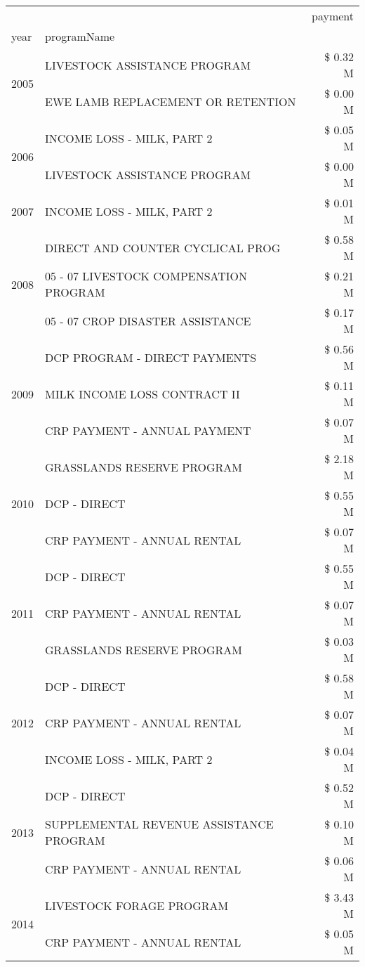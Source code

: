 \begin{tabular}{llr}
\toprule
 &  & payment \\
year & programName &  \\
\midrule
\multirow[t]{2}{*}{2005} & LIVESTOCK ASSISTANCE PROGRAM & \$ 0.32 M \\
 & EWE LAMB REPLACEMENT OR RETENTION & \$ 0.00 M \\
\cline{1-3}
\multirow[t]{2}{*}{2006} & INCOME LOSS - MILK, PART 2 & \$ 0.05 M \\
 & LIVESTOCK ASSISTANCE PROGRAM & \$ 0.00 M \\
\cline{1-3}
2007 & INCOME LOSS - MILK, PART 2 & \$ 0.01 M \\
\cline{1-3}
\multirow[t]{3}{*}{2008} & DIRECT AND COUNTER CYCLICAL PROG & \$ 0.58 M \\
 & 05 - 07 LIVESTOCK COMPENSATION PROGRAM & \$ 0.21 M \\
 & 05 - 07 CROP DISASTER ASSISTANCE & \$ 0.17 M \\
\cline{1-3}
\multirow[t]{3}{*}{2009} & DCP PROGRAM - DIRECT PAYMENTS & \$ 0.56 M \\
 & MILK INCOME LOSS CONTRACT II & \$ 0.11 M \\
 & CRP PAYMENT - ANNUAL PAYMENT & \$ 0.07 M \\
\cline{1-3}
\multirow[t]{3}{*}{2010} & GRASSLANDS RESERVE PROGRAM & \$ 2.18 M \\
 & DCP - DIRECT & \$ 0.55 M \\
 & CRP PAYMENT - ANNUAL RENTAL & \$ 0.07 M \\
\cline{1-3}
\multirow[t]{3}{*}{2011} & DCP - DIRECT & \$ 0.55 M \\
 & CRP PAYMENT - ANNUAL RENTAL & \$ 0.07 M \\
 & GRASSLANDS RESERVE PROGRAM & \$ 0.03 M \\
\cline{1-3}
\multirow[t]{3}{*}{2012} & DCP - DIRECT & \$ 0.58 M \\
 & CRP PAYMENT - ANNUAL RENTAL & \$ 0.07 M \\
 & INCOME LOSS - MILK, PART 2 & \$ 0.04 M \\
\cline{1-3}
\multirow[t]{3}{*}{2013} & DCP - DIRECT & \$ 0.52 M \\
 & SUPPLEMENTAL REVENUE ASSISTANCE PROGRAM & \$ 0.10 M \\
 & CRP PAYMENT - ANNUAL RENTAL & \$ 0.06 M \\
\cline{1-3}
\multirow[t]{3}{*}{2014} & LIVESTOCK FORAGE PROGRAM & \$ 3.43 M \\
 & CRP PAYMENT - ANNUAL RENTAL & \$ 0.05 M \\

\end{tabular}
